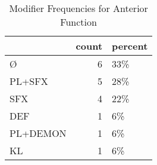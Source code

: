 \begin{table}[htbp!]
\centering
\caption{Modifier Frequencies for Anterior Function}
\label{table:ant_mod_cp}
\begin{tabular}{lrl}
\toprule
{} &  count & percent \\
\midrule
Ø        &      6 &     33\% \\
PL+SFX   &      5 &     28\% \\
SFX      &      4 &     22\% \\
DEF      &      1 &      6\% \\
PL+DEMON &      1 &      6\% \\
KL       &      1 &      6\% \\
\bottomrule
\end{tabular}
\end{table}
